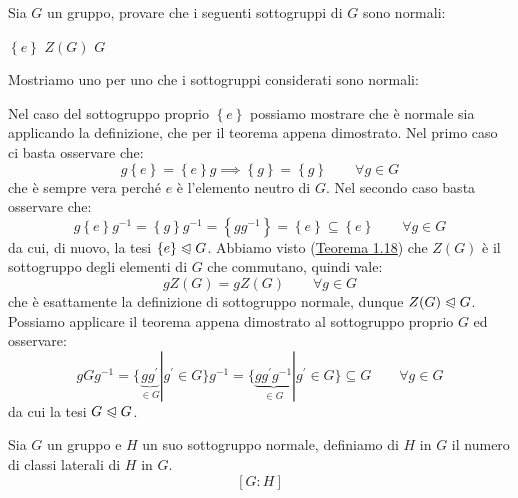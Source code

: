 \documentclass[11pt]{scrartcl}
\begin{document}
\begin{exercise}
Sia $G$ un gruppo, provare che i seguenti sottogruppi di $G$ sono normali:
	\begin{enumerate}[(1)]
	\ii $\left\{e\right\}$
	\ii $Z(G)$
	\ii $G$
	\end{enumerate}
\end{exercise}

\begin{soln}
Mostriamo uno per uno che i sottogruppi considerati sono normali:
\begin{enumerate}[(1)]
	\ii Nel caso del sottogruppo proprio $\left\{e\right\}$ possiamo mostrare che è normale sia applicando la definizione, che per il teorema appena dimostrato. Nel primo caso ci basta osservare che:
		\[ g\left\{e\right\}=\left\{e\right\}g
		\implies
		\left\{g\right\}=\left\{g\right\}
		\qquad
		\forall g \in G
		\]
che è sempre vera perché $e$ è l'elemento neutro di $G$. Nel secondo caso basta osservare che:
		\[ g\left\{e\right\}g^{-1} = \left\{g\right\}g^{-1} = \left\{gg^{-1}\right\} = \left\{e\right\} \subseteq \left\{e\right\}
		\qquad \forall g \in G
		\]
da cui, di nuovo, la tesi $ \{e\}\trianglelefteqslant G$.
	\ii Abbiamo visto (\hyperref[g:centro]{Teorema 1.18}) che $Z(G)$ è il sottogruppo degli elementi di $G$ che commutano, quindi vale:
		\[ gZ(G)=gZ(G)
		\qquad
		\forall g \in G
		\]
	che è esattamente la definizione di sottogruppo normale, dunque $Z(G) \trianglelefteqslant G$.	
	\ii Possiamo applicare il teorema appena dimostrato al sottogruppo proprio $G$ ed osservare:
		\[ gGg^{-1}
		=
		\{\underbrace{gg^{\prime}}_{\in G} | g^{\prime} \in G\}g^{-1}
		=
		\{\underbrace{gg^{\prime}g^{-1}}_{\in G} | g^{\prime} \in G\} \subseteq G
		\qquad
		\forall g \in G
		\]
da cui la tesi $G \trianglelefteqslant G$.
	\end{enumerate}
\end{soln}

\begin{definition}
Sia $G$ un gruppo e $H$ un suo sottogruppo normale, definiamo  di $H$ in $G$ il numero di classi laterali di $H$ in $G$.
	\[ [G : H]\]
\end{definition}
\end{document}

